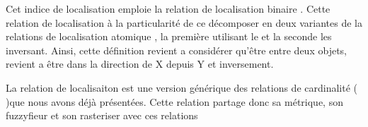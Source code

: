 Cet indice de localisation emploie la relation de localisation binaire
.
%
Cette relation de localisation à la particularité de ce décomposer
en deux variantes de la relations de localisation atomique
, la première utilisant le
%
et la seconde les inversant.
%
Ainsi, cette définition revient a considérer qu'être entre deux
objets, revient a être dans la direction de X depuis Y et inversement.

La relation de localisaiton  est
une version générique des relations de cardinalité (\eg
{})que nous avons déjà présentées.
%
Cette relation partage donc sa métrique, son fuzzyfieur et son
rasteriser avec ces relations




\begin{figure}
  \centering
  \hspace{1cm}

\end{figure}
